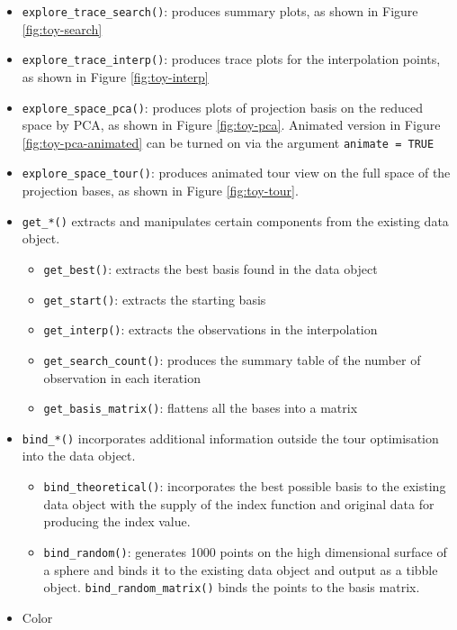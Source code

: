 \begin{itemize}
\item
  \texttt{explore\_trace\_search()}: produces summary plots, as shown in
  Figure \ref{fig:toy-search}
\item
  \texttt{explore\_trace\_interp()}: produces trace plots for the
  interpolation points, as shown in Figure \ref{fig:toy-interp}
\item
  \texttt{explore\_space\_pca()}: produces plots of projection basis on
  the reduced space by PCA, as shown in Figure \ref{fig:toy-pca}.
  Animated version in Figure \ref{fig:toy-pca-animated} can be turned on
  via the argument \texttt{animate\ =\ TRUE}
\item
  \texttt{explore\_space\_tour()}: produces animated tour view on the
  full space of the projection bases, as shown in Figure
  \ref{fig:toy-tour}.
\item
  \texttt{get\_*()} extracts and manipulates certain components from the
  existing data object.

  \begin{itemize}
  \tightlist
  \item
    \texttt{get\_best()}: extracts the best basis found in the data
    object
  \item
    \texttt{get\_start()}: extracts the starting basis
  \item
    \texttt{get\_interp()}: extracts the observations in the
    interpolation
  \item
    \texttt{get\_search\_count()}: produces the summary table of the
    number of observation in each iteration
  \item
    \texttt{get\_basis\_matrix()}: flattens all the bases into a matrix
  \end{itemize}
\item
  \texttt{bind\_*()} incorporates additional information outside the
  tour optimisation into the data object.

  \begin{itemize}
  \tightlist
  \item
    \texttt{bind\_theoretical()}: incorporates the best possible basis
    to the existing data object with the supply of the index function
    and original data for producing the index value.
  \item
    \texttt{bind\_random()}: generates 1000 points on the high
    dimensional surface of a sphere and binds it to the existing data
    object and output as a tibble object.
    \texttt{bind\_random\_matrix()} binds the points to the basis
    matrix.
  \end{itemize}
\item
  Color


\end{itemize}
